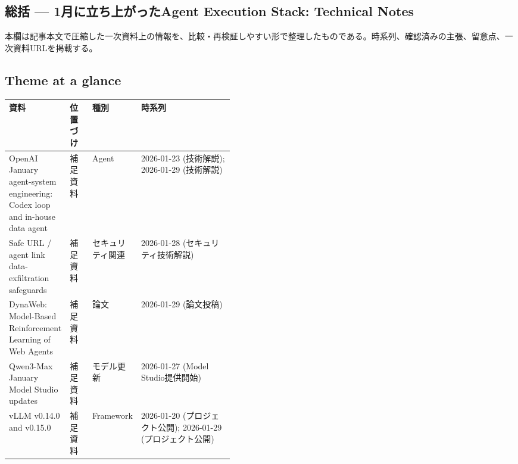 \subsection*{総括 — 1月に立ち上がったAgent Execution Stack: Technical Notes}
本欄は記事本文で圧縮した一次資料上の情報を、比較・再検証しやすい形で整理したものである。時系列、確認済みの主張、留意点、一次資料URLを掲載する。
\medskip
\subsection*{Theme at a glance}
\begin{center}
\footnotesize
\begin{tabularx}{\linewidth}{@{}p{0.20\linewidth}p{0.10\linewidth}p{0.14\linewidth}X@{}}
\toprule
資料 & 位置づけ & 種別 & 時系列 \\
\midrule
OpenAI January agent-system engineering: Codex loop and in-house data agent & 補足資料 & Agent & 2026-01-23 (技術解説); 2026-01-29 (技術解説) \\
Safe URL / agent link data-exfiltration safeguards & 補足資料 & セキュリティ関連 & 2026-01-28 (セキュリティ技術解説) \\
DynaWeb: Model-Based Reinforcement Learning of Web Agents & 補足資料 & 論文 & 2026-01-29 (論文投稿) \\
Qwen3-Max January Model Studio updates & 補足資料 & モデル更新 & 2026-01-27 (Model Studio提供開始) \\
vLLM v0.14.0 and v0.15.0 & 補足資料 & Framework & 2026-01-20 (プロジェクト公開); 2026-01-29 (プロジェクト公開) \\
\bottomrule
\end{tabularx}
\end{center}
\normalsize

